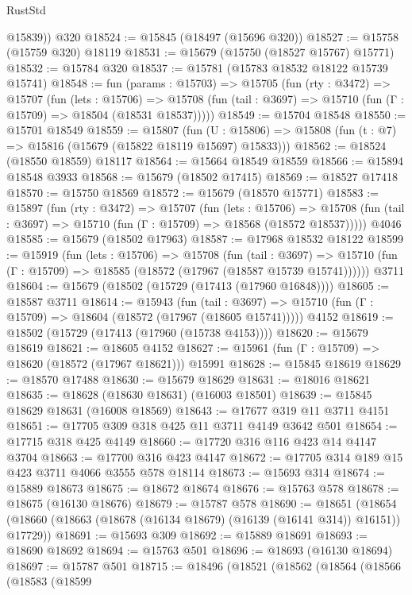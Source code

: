 \begin{lexlean}{RustStd}
\begin{coremodule}
        @15839))
    @320
@18524 := @15845 (@18497 (@15696 @320))
@18527 := @15758 (@15759 @320) @18119
@18531 := @15679 (@15750 (@18527 @15767) @15771)
@18532 := @15784 @320
@18537 := @15781 (@15783 @18532 @18122 @15739 @15741)
@18548 := fun (params : @15703) =>
  @15705
    (fun (rty : @3472) =>
    @15707
      (fun (lets : @15706) =>
      @15708 (fun (tail : @3697) => @15710 (fun (Γ : @15709) => @18504 (@18531 @18537)))))
@18549 := @15704 @18548
@18550 := @15701 @18549
@18559 := @15807
    (fun (U : @15806) => @15808 (fun (t : @7) => @15816 (@15679 (@15822 @18119 @15697) @15833)))
@18562 := @18524 (@18550 @18559) @18117
@18564 := @15664 @18549 @18559
@18566 := @15894 @18548 @3933
@18568 := @15679 (@18502 @17415)
@18569 := @18527 @17418
@18570 := @15750 @18569
@18572 := @15679 (@18570 @15771)
@18583 := @15897
    (fun (rty : @3472) =>
    @15707
      (fun (lets : @15706) =>
      @15708 (fun (tail : @3697) => @15710 (fun (Γ : @15709) => @18568 (@18572 @18537)))))
    @4046
@18585 := @15679 (@18502 @17963)
@18587 := @17968 @18532 @18122
@18599 := @15919
    (fun (lets : @15706) =>
    @15708
      (fun (tail : @3697) =>
      @15710 (fun (Γ : @15709) => @18585 (@18572 (@17967 (@18587 @15739 @15741))))))
    @3711
@18604 := @15679 (@18502 (@15729 (@17413 (@17960 @16848))))
@18605 := @18587 @3711
@18614 := @15943
    (fun (tail : @3697) => @15710 (fun (Γ : @15709) => @18604 (@18572 (@17967 (@18605 @15741)))))
    @4152
@18619 := @18502 (@15729 (@17413 (@17960 (@15738 @4153))))
@18620 := @15679 @18619
@18621 := @18605 @4152
@18627 := @15961 (fun (Γ : @15709) => @18620 (@18572 (@17967 @18621))) @15991
@18628 := @15845 @18619
@18629 := @18570 @17488
@18630 := @15679 @18629
@18631 := @18016 @18621
@18635 := @18628 (@18630 @18631) (@16003 @18501)
@18639 := @15845 @18629 @18631 (@16008 @18569)
@18643 := @17677 @319 @11 @3711 @4151
@18651 := @17705 @309 @318 @425 @11 @3711 @4149 @3642 @501
@18654 := @17715 @318 @425 @4149
@18660 := @17720 @316 @116 @423 @14 @4147 @3704
@18663 := @17700 @316 @423 @4147
@18672 := @17705 @314 @189 @15 @423 @3711 @4066 @3555 @578 @18114
@18673 := @15693 @314
@18674 := @15889 @18673
@18675 := @18672 @18674
@18676 := @15763 @578
@18678 := @18675 (@16130 @18676)
@18679 := @15787 @578
@18690 := @18651
    (@18654 (@18660 (@18663 (@18678 (@16134 @18679) (@16139 (@16141 @314)) @16151)) @17729))
@18691 := @15693 @309
@18692 := @15889 @18691
@18693 := @18690 @18692
@18694 := @15763 @501
@18696 := @18693 (@16130 @18694)
@18697 := @15787 @501
@18715 := @18496
    (@18521
      (@18562
        (@18564
          (@18566
            (@18583
              (@18599

\end{coremodule}
\end{lexlean}
